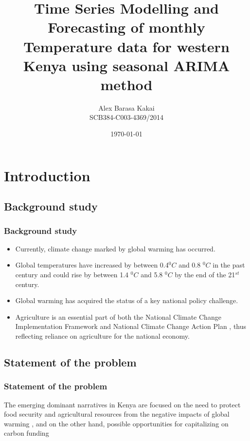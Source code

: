 \documentclass[]{beamer}
\title{Time Series Modelling and Forecasting of monthly Temperature data for western Kenya using seasonal ARIMA method}
\author{Alex Barasa Kakai\\
SCB384-C003-4369/2014}
\institute{Jomo Kenyatta University of Agriculture and Technology}
\date{\today}
\begin{document}
\begin{frame}
  \titlepage
\end{frame}
\section[Outline]{}
\begin{frame}
  \tableofcontents
\end{frame}


\section{Introduction}
\subsection{Background study}
\begin{frame}
	\frametitle{Background study}
  \begin{itemize}
  \item Currently, climate change marked by global warming has occurred. \parencite{letcher2009}
  \item Global temperatures have increased by between 0.4$^{0} C$ and 0.8 $^{0}C$ in the past century and could rise by between 1.4 $^{0}C$ and 5.8 $^{0}C$ by the end of the 21$^{st}$ century.\parencite{ipcc2013}
  \item Global warming has acquired the status of a key national policy challenge.\parencite{ipcc2013}
  \item  Agriculture is an essential part of both the National Climate Change Implementation Framework and National Climate Change Action Plan \parencite{19}, thus reflecting reliance on agriculture for the national economy.
  \end{itemize}
\end{frame}

\subsection{Statement of the problem}
\begin{frame}
	\frametitle{Statement of the problem} 
The emerging dominant narratives in Kenya are focused on the need to protect food security and agricultural resources from the negative impacts of global warming \parencite{12}, and on the other hand, possible opportunities for capitalizing on carbon funding \parencite{19}
\end{frame}
\end{document}
